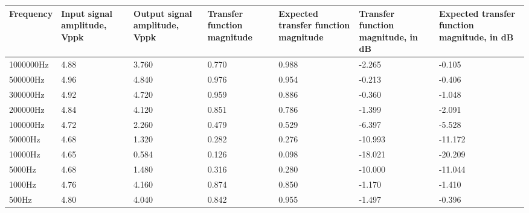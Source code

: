 \begin{table}[!h]
\begin{center}
\begin{tabular}{|p{2cm}|p{2cm}|p{2cm}|p{2cm}|p{2cm}|p{2cm}|p{2cm}|}
\hline
Frequency & Input signal amplitude, Vppk & Output signal amplitude, Vppk & Transfer function magnitude & Expected transfer function magnitude & Transfer function magnitude, in dB & Expected transfer function magnitude, in dB \\
\hline
1000000Hz	&	4.88	&	3.760	&	0.770	&	0.988	&	-2.265	&	-0.105	\\
\hline
500000Hz	&	4.96	&	4.840	&	0.976	&	0.954	&	-0.213	&	-0.406	\\
\hline
300000Hz	&	4.92	&	4.720	&	0.959	&	0.886	&	-0.360	&	-1.048	\\
\hline
200000Hz	&	4.84	&	4.120	&	0.851	&	0.786	&	-1.399	&	-2.091	\\
\hline
100000Hz	&	4.72	&	2.260	&	0.479	&	0.529	&	-6.397	&	-5.528	\\
\hline
50000Hz	&	4.68	&	1.320	&	0.282	&	0.276	&	-10.993	&	-11.172	\\
\hline
10000Hz	&	4.65	&	0.584	&	0.126	&	0.098	&	-18.021	&	-20.209	\\
\hline
5000Hz	&	4.68	&	1.480	&	0.316	&	0.280	&	-10.000	&	-11.044	\\
\hline
1000Hz	&	4.76	&	4.160	&	0.874	&	0.850	&	-1.170	&	-1.410	\\
\hline
500Hz	&	4.80	&	4.040	&	0.842	&	0.955	&	-1.497	&	-0.396	\\
\hline
\end{tabular}
\label{tab-band_reject}
\end{center}
\end{table}
